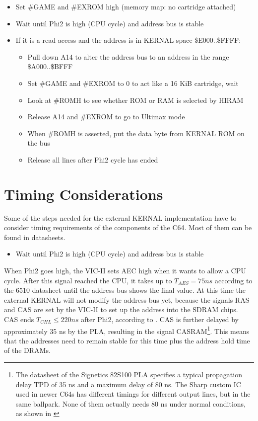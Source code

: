 \documentclass[a4paper,oneside]{memoir}
\begin{document}
\begin{itemize}
\item Set \#GAME and \#EXROM high (memory map: no cartridge attached)
\item Wait until Phi2 is high (CPU cycle) and address bus is stable
\item If it is a read access and the address is in KERNAL space \$E000..\$FFFF:
    \begin{itemize}
    \item Pull down A14 to alter the address bus to an address in the range \$A000..\$BFFF
    \item Set \#GAME and \#EXROM to 0 to act like a 16 KiB cartridge, wait
    \item Look at \#ROMH to see whether ROM or RAM is selected by HIRAM
    \item Release A14 and \#EXROM to go to Ultimax mode
    \item When \#ROMH is asserted, put the data byte from KERNAL ROM on the bus
    \item Release all lines after Phi2 cycle has ended
    \end{itemize}
\end{itemize}

\section{Timing Considerations}

\label{sec:timing}Some of the steps needed for the external KERNAL implementation have
to consider timing requirements of the components of the C64. 
Most of them can be found in datasheets.

\begin{itemize}
\item Wait until Phi2 is high (CPU cycle) and address bus is stable
\end{itemize}

When Phi2 goes high, the VIC-II sets AEC high when it wants to allow a
CPU cycle. After this signal reached the CPU, it takes up to $T_{AES} =
75 ns$ according to the 6510 datasheet until the address bus shows
the final value. 
At this time the external KERNAL will not modify the address bus yet, 
because the signals RAS and CAS are set by the VIC-II to set up the address into the SDRAM chips.
CAS ends $T_{CHL} \le 220 ns$ after Phi2, according to \cite{VICII}.
CAS is further delayed by approximately 35 ns by the PLA, resulting in the signal CASRAM\footnote{The datasheet of the Signetics 82S100 PLA \cite{Si75} specifies a typical
propagation delay TPD of 35 ns and a maximum delay of 80 ns. The
Sharp custom IC used in newer C64s has different timings for
different output lines, but in the same ballpark. None of them actually needs 80 ns under normal conditions, as shown in \cite{PLA12}}.
This means that the addresses need to remain stable for this time plus the address hold time of the DRAMs. 
\end{document}
